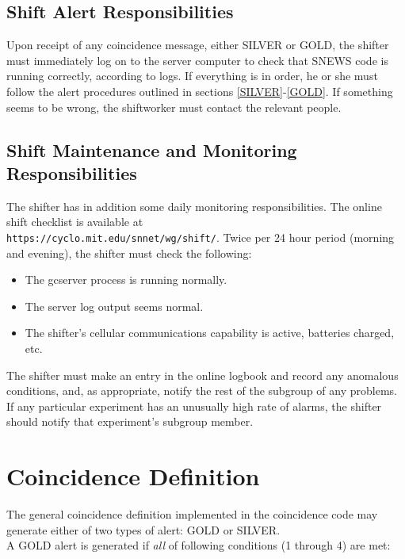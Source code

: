 \documentclass{article}
\begin{document}
\subsection{Shift Alert Responsibilities}

Upon receipt of any coincidence message, either SILVER or GOLD, the
shifter must immediately log on to the server computer to check that
SNEWS code is running correctly, according to logs.  If everything
is in order, he or she must follow
the alert procedures outlined in sections \ref{SILVER}-\ref{GOLD}.  If
something seems to be wrong, the shiftworker must contact the
relevant people.

\subsection{Shift Maintenance and Monitoring Responsibilities}

The shifter has in addition some daily monitoring responsibilities.
The online shift checklist is available at\\
\texttt{https://cyclo.mit.edu/snnet/wg/shift/}.
Twice per 24 hour period (morning and evening), 
the shifter must check the following:

\begin{itemize}
\item The gcserver process is running normally.
\item The server log output seems normal.
\item The shifter's cellular communications capability is active,
batteries charged, etc.

\end{itemize}

The shifter must make an entry in the online logbook and record any
anomalous conditions, and, as appropriate, notify the rest of the subgroup
of any problems.  If any particular experiment has an unusually
high rate of alarms, the shifter should notify that experiment's
subgroup member.



\section{Coincidence Definition}

The general coincidence definition implemented in the coincidence code
may generate either of two types of alert: GOLD or SILVER.\\
A GOLD alert is generated if {\it all} of
following conditions (1 through 4) are met:
\end{document}
